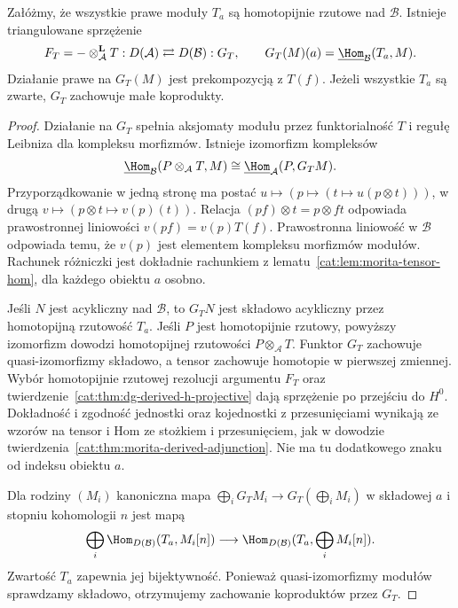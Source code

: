 \begin{twierdzenie}\label{cat:thm:morita-bimodule-adjunction}
Załóżmy, że wszystkie prawe moduły $T_a$ są homotopijnie rzutowe nad $\mathcal B$. Istnieje triangulowane sprzężenie
\[
 F_T=-\otimes_{\mathcal A}^{\mathbf L}T:D(\mathcal A)
 \rightleftarrows D(\mathcal B):G_T,
 \qquad
 G_T(M)(a)=\underline{\Hom}_{\mathcal B}(T_a,M).
\]
Działanie prawe na $G_T(M)$ jest prekompozycją z $T(f)$. Jeżeli wszystkie $T_a$ są zwarte, $G_T$ zachowuje małe koprodukty.
\end{twierdzenie}
\begin{proof}
Działanie na $G_T$ spełnia aksjomaty modułu przez funktorialność $T$ i regułę Leibniza dla kompleksu morfizmów. Istnieje izomorfizm kompleksów
\[
 \underline{\Hom}_{\mathcal B}(P\otimes_{\mathcal A}T,M)
 \cong\underline{\Hom}_{\mathcal A}(P,G_T M).
\]
Przyporządkowanie w jedną stronę ma postać $u\mapsto(p\mapsto(t\mapsto u(p\otimes t)))$, w drugą $v\mapsto(p\otimes t\mapsto v(p)(t))$. Relacja $(pf)\otimes t=p\otimes ft$ odpowiada prawostronnej liniowości $v(pf)=v(p)T(f)$. Prawostronna liniowość w $\mathcal B$ odpowiada temu, że $v(p)$ jest elementem kompleksu morfizmów modułów. Rachunek różniczki jest dokładnie rachunkiem z lematu~\ref{cat:lem:morita-tensor-hom}, dla każdego obiektu $a$ osobno.

Jeśli $N$ jest acykliczny nad $\mathcal B$, to $G_TN$ jest składowo acykliczny przez homotopijną rzutowość $T_a$. Jeśli $P$ jest homotopijnie rzutowy, powyższy izomorfizm dowodzi homotopijnej rzutowości $P\otimes_{\mathcal A}T$. Funktor $G_T$ zachowuje quasi-izomorfizmy składowo, a tensor zachowuje homotopie w pierwszej zmiennej. Wybór homotopijnie rzutowej rezolucji argumentu $F_T$ oraz twierdzenie~\ref{cat:thm:dg-derived-h-projective} dają sprzężenie po przejściu do $H^0$. Dokładność i zgodność jednostki oraz kojednostki z przesunięciami wynikają ze wzorów na tensor i Hom ze stożkiem i przesunięciem, jak w dowodzie twierdzenia~\ref{cat:thm:morita-derived-adjunction}. Nie ma tu dodatkowego znaku od indeksu obiektu $a$.

Dla rodziny $(M_i)$ kanoniczna mapa $\bigoplus_iG_TM_i\to G_T(\bigoplus_i M_i)$ w składowej $a$ i stopniu kohomologii $n$ jest mapą
\[
 \bigoplus_i\Hom_{D(\mathcal B)}(T_a,M_i[n])
 \longrightarrow\Hom_{D(\mathcal B)}(T_a,\bigoplus_i M_i[n]).
\]
Zwartość $T_a$ zapewnia jej bijektywność. Ponieważ quasi-izomorfizmy modułów sprawdzamy składowo, otrzymujemy zachowanie koproduktów przez $G_T$.
\end{proof}

